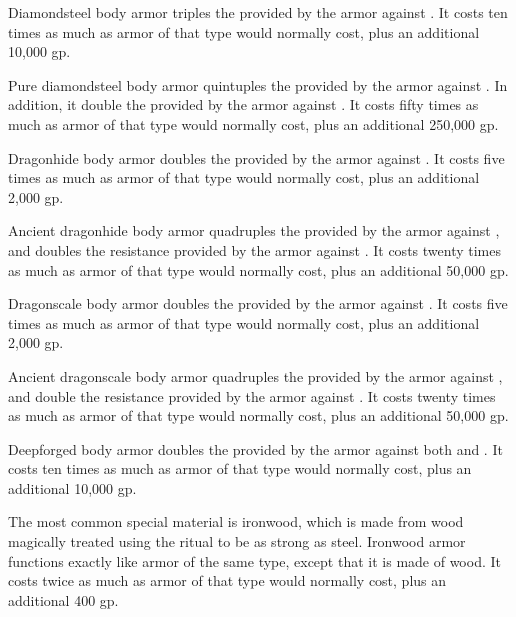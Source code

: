          Diamondsteel body armor triples the  provided by the armor against .
        It costs ten times as much as armor of that type would normally cost, plus an additional 10,000 gp.

         Pure diamondsteel body armor quintuples the  provided by the armor against .
        In addition, it double the  provided by the armor against .
        It costs fifty times as much as armor of that type would normally cost, plus an additional 250,000 gp.

         Dragonhide body armor doubles the  provided by the armor against .
        It costs five times as much as armor of that type would normally cost, plus an additional 2,000 gp.

         Ancient dragonhide body armor quadruples the  provided by the armor against , and doubles the resistance provided by the armor against .
        It costs twenty times as much as armor of that type would normally cost, plus an additional 50,000 gp.

         Dragonscale body armor doubles the  provided by the armor against .
        It costs five times as much as armor of that type would normally cost, plus an additional 2,000 gp.

         Ancient dragonscale body armor quadruples the  provided by the armor against , and double the resistance provided by the armor against .
        It costs twenty times as much as armor of that type would normally cost, plus an additional 50,000 gp.

         Deepforged body armor doubles the  provided by the armor against both  and .
        It costs ten times as much as armor of that type would normally cost, plus an additional 10,000 gp.

         The most common special material is ironwood, which is made from wood magically treated using the  ritual to be as strong as steel. Ironwood armor functions exactly like  armor of the same type, except that it is made of wood.
        It costs twice as much as armor of that type would normally cost, plus an additional 400 gp.

